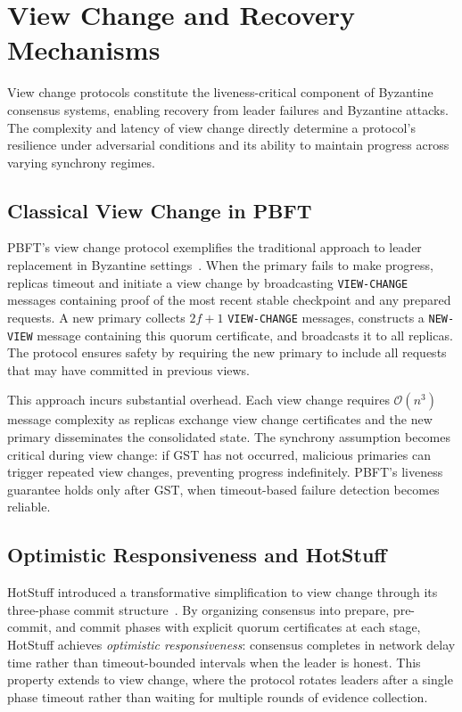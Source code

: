 \section{View Change and Recovery Mechanisms}

View change protocols constitute the liveness-critical component of Byzantine consensus systems, enabling recovery from leader failures and Byzantine attacks. The complexity and latency of view change directly determine a protocol's resilience under adversarial conditions and its ability to maintain progress across varying synchrony regimes.

\subsection{Classical View Change in PBFT}

PBFT's view change protocol exemplifies the traditional approach to leader replacement in Byzantine settings~\cite{castro1999practical}. When the primary fails to make progress, replicas timeout and initiate a view change by broadcasting \texttt{VIEW-CHANGE} messages containing proof of the most recent stable checkpoint and any prepared requests. A new primary collects $2f+1$ \texttt{VIEW-CHANGE} messages, constructs a \texttt{NEW-VIEW} message containing this quorum certificate, and broadcasts it to all replicas. The protocol ensures safety by requiring the new primary to include all requests that may have committed in previous views.

This approach incurs substantial overhead. Each view change requires $\mathcal{O}(n^3)$ message complexity as replicas exchange view change certificates and the new primary disseminates the consolidated state. The synchrony assumption becomes critical during view change: if GST has not occurred, malicious primaries can trigger repeated view changes, preventing progress indefinitely. PBFT's liveness guarantee holds only after GST, when timeout-based failure detection becomes reliable.

\subsection{Optimistic Responsiveness and HotStuff}

HotStuff introduced a transformative simplification to view change through its three-phase commit structure~\cite{yin2019hotstuff}. By organizing consensus into prepare, pre-commit, and commit phases with explicit quorum certificates at each stage, HotStuff achieves \emph{optimistic responsiveness}: consensus completes in network delay time rather than timeout-bounded intervals when the leader is honest. This property extends to view change, where the protocol rotates leaders after a single phase timeout rather than waiting for multiple rounds of evidence collection.

